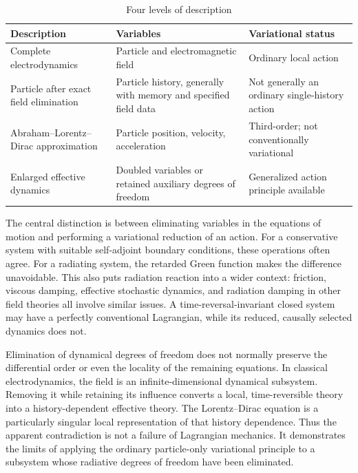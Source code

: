 \begin{table}[h]
    \caption{Four levels of description}
    \begin{tabular}{p{}p{}p{}}
        \toprule
        Description	&Variables	&Variational status\\
        \midrule
        Complete electrodynamics&	Particle and electromagnetic field&	Ordinary local action\\
        Particle after exact field elimination &	Particle history, generally with memory and specified field data&	Not generally an ordinary single-history action\\
        Abraham–Lorentz–Dirac approximation&	Particle position, velocity, acceleration&	Third-order; not conventionally variational\\
        Enlarged effective dynamics&	Doubled variables or retained auxiliary degrees of freedom&	Generalized action principle available\\
\bottomrule
    \end{tabular}
\end{table}
The central distinction is between eliminating variables in the equations of
motion and performing a variational reduction of an action.
For a conservative system with suitable self-adjoint boundary conditions, these
operations often agree. For a radiating system, the retarded Green function
makes the difference unavoidable.
This also puts radiation reaction into a wider context: friction, viscous
damping, effective stochastic dynamics, and radiation damping in other field
theories all involve similar issues. A time-reversal-invariant closed system
may have a perfectly conventional Lagrangian, while its reduced, causally
selected dynamics does not.

Elimination of dynamical degrees of freedom does not normally preserve the
differential order or even the locality of the remaining equations.
In classical electrodynamics, the field is an infinite-dimensional dynamical
subsystem. Removing it while retaining its influence converts a local,
time-reversible theory into a history-dependent effective theory. The
Lorentz–Dirac equation is a particularly singular local representation of that
history dependence.
Thus the apparent contradiction is not a failure of Lagrangian mechanics. It
demonstrates the limits of applying the ordinary particle-only variational
principle to a subsystem whose radiative degrees of freedom have been
eliminated.
